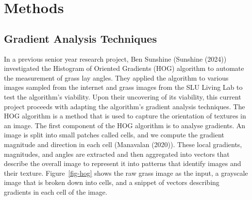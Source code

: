 \documentclass[
]{article}
\begin{document}
\clearpage

\section{Methods}\label{methods}

\subsection{Gradient Analysis
Techniques}\label{gradient-analysis-techniques}

In a previous senior year research project, Ben Sunshine (Sunshine
(2024)) investigated the Histogram of Oriented Gradients (HOG) algorithm
to automate the measurement of grass lay angles. They applied the
algorithm to various images sampled from the internet and grass images
from the SLU Living Lab to test the algorithm's viability. Upon their
uncovering of its viability, this current project proceeds with adapting
the algorithm's gradient analysis techniques. The HOG algorithm is a
method that is used to capture the orientation of textures in an image.
The first component of the HOG algorithm is to analyse gradients. An
image is split into small patches called cells, and we compute the
gradient magnitude and direction in each cell (Manavalan (2020)). These
local gradients, magnitudes, and angles are extracted and then
aggregated into vectors that describe the overall image to represent it
into patterns that identify images and their texture.
Figure~\ref{fig-hog} shows the raw grass image as the input, a grayscale
image that is broken down into cells, and a snippet of vectors
describing gradients in each cell of the image.
\end{document}
